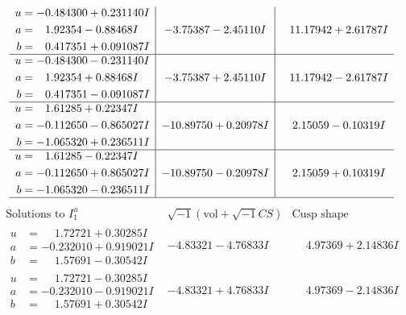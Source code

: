 \documentclass[1p]{elsarticle_modified}
\theoremstyle{definition}
\newcommand{\I}{\sqrt{-1}}
\begin{document}
$$\begin{array}{c|c|c}
\begin{aligned}
u &= -0.484300 + 0.231140 I \\
a &= \phantom{-}1.92354 - 0.88468 I \\
b &= \phantom{-}0.417351 + 0.091087 I\end{aligned}
 & -3.75387 - 2.45110 I & \phantom{-}11.17942 + 2.61787 I \\ \hline\begin{aligned}
u &= -0.484300 - 0.231140 I \\
a &= \phantom{-}1.92354 + 0.88468 I \\
b &= \phantom{-}0.417351 - 0.091087 I\end{aligned}
 & -3.75387 + 2.45110 I & \phantom{-}11.17942 - 2.61787 I \\ \hline\begin{aligned}
u &= \phantom{-}1.61285 + 0.22347 I \\
a &= -0.112650 - 0.865027 I \\
b &= -1.065320 + 0.236511 I\end{aligned}
 & -10.89750 + 0.20978 I & \phantom{-}2.15059 - 0.10319 I \\ \hline\begin{aligned}
u &= \phantom{-}1.61285 - 0.22347 I \\
a &= -0.112650 + 0.865027 I \\
b &= -1.065320 - 0.236511 I\end{aligned}
 & -10.89750 - 0.20978 I & \phantom{-}2.15059 + 0.10319 I\\
 \hline 
 \end{array}$$\newpage$$\begin{array}{c|c|c}  
\text{Solutions to }I^u_{1}& \I (\text{vol} + \sqrt{-1}CS) & \text{Cusp shape}\\
 \hline 
\begin{aligned}
u &= \phantom{-}1.72721 + 0.30285 I \\
a &= -0.232010 + 0.919021 I \\
b &= \phantom{-}1.57691 - 0.30542 I\end{aligned}
 & -4.83321 - 4.76833 I & \phantom{-}4.97369 + 2.14836 I \\ \hline\begin{aligned}
u &= \phantom{-}1.72721 - 0.30285 I \\
a &= -0.232010 - 0.919021 I \\
b &= \phantom{-}1.57691 + 0.30542 I\end{aligned}
 & -4.83321 + 4.76833 I & \phantom{-}4.97369 - 2.14836 I \\ \hline\begin{aligned}

\end{aligned}
\end{array}$$
\end{document}
